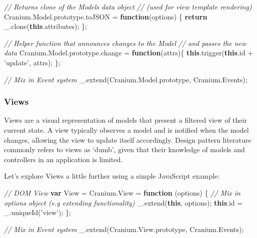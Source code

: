 \documentclass[9pt]{book}
\newenvironment{Shaded}{}{}
\newcommand{\KeywordTok}[1]{\textcolor[rgb]{0.00,0.44,0.13}{\textbf{{#1}}}}
\newcommand{\StringTok}[1]{\textcolor[rgb]{0.25,0.44,0.63}{{#1}}}
\newcommand{\CommentTok}[1]{\textcolor[rgb]{0.38,0.63,0.69}{\textit{{#1}}}}
\newcommand{\OtherTok}[1]{\textcolor[rgb]{0.00,0.44,0.13}{{#1}}}
\newcommand{\FunctionTok}[1]{\textcolor[rgb]{0.02,0.16,0.49}{{#1}}}
\newcommand{\NormalTok}[1]{{#1}}
\begin{document}
\begin{Shaded}
\begin{Highlighting}[]
\CommentTok{// Returns clone of the Models data object}
\CommentTok{// (used for view template rendering)}
\OtherTok{Cranium}\NormalTok{.}\OtherTok{Model}\NormalTok{.}\OtherTok{prototype}\NormalTok{.}\FunctionTok{toJSON} \NormalTok{= }\KeywordTok{function}\NormalTok{(options) \{}
    \KeywordTok{return} \OtherTok{_}\NormalTok{.}\FunctionTok{clone}\NormalTok{(}\KeywordTok{this}\NormalTok{.}\FunctionTok{attributes}\NormalTok{);}
\NormalTok{\};}

\CommentTok{// Helper function that announces changes to the Model}
\CommentTok{// and passes the new data}
\OtherTok{Cranium}\NormalTok{.}\OtherTok{Model}\NormalTok{.}\OtherTok{prototype}\NormalTok{.}\FunctionTok{change} \NormalTok{= }\KeywordTok{function}\NormalTok{(attrs)\{}
    \KeywordTok{this}\NormalTok{.}\FunctionTok{trigger}\NormalTok{(}\KeywordTok{this}\NormalTok{.}\FunctionTok{id} \NormalTok{+ }\StringTok{'update'}\NormalTok{, attrs);}
\NormalTok{\};}

\CommentTok{// Mix in Event system}
\OtherTok{_}\NormalTok{.}\FunctionTok{extend}\NormalTok{(}\OtherTok{Cranium}\NormalTok{.}\OtherTok{Model}\NormalTok{.}\FunctionTok{prototype}\NormalTok{, }\OtherTok{Cranium}\NormalTok{.}\FunctionTok{Events}\NormalTok{);}
\end{Highlighting}
\end{Shaded}

\subsubsection{Views}\label{views-4}

Views are a visual representation of models that present a filtered view
of their current state. A view typically observes a model and is
notified when the model changes, allowing the view to update itself
accordingly. Design pattern literature commonly refers to views as
`dumb', given that their knowledge of models and controllers in an
application is limited.

Let's explore Views a little further using a simple JavaScript example:

\begin{Shaded}
\begin{Highlighting}[]
\CommentTok{// DOM View}
\KeywordTok{var} \NormalTok{View = }\OtherTok{Cranium}\NormalTok{.}\FunctionTok{View} \NormalTok{= }\KeywordTok{function} \NormalTok{(options) \{}
  \CommentTok{// Mix in options object (e.g extending functionality)}
  \OtherTok{_}\NormalTok{.}\FunctionTok{extend}\NormalTok{(}\KeywordTok{this}\NormalTok{, options);}
  \KeywordTok{this}\NormalTok{.}\FunctionTok{id} \NormalTok{= }\OtherTok{_}\NormalTok{.}\FunctionTok{uniqueId}\NormalTok{(}\StringTok{'view'}\NormalTok{);}
\NormalTok{\};}

\CommentTok{// Mix in Event system}
\OtherTok{_}\NormalTok{.}\FunctionTok{extend}\NormalTok{(}\OtherTok{Cranium}\NormalTok{.}\OtherTok{View}\NormalTok{.}\FunctionTok{prototype}\NormalTok{, }\OtherTok{Cranium}\NormalTok{.}\FunctionTok{Events}\NormalTok{);}
\end{Highlighting}
\end{Shaded}
\end{document}
